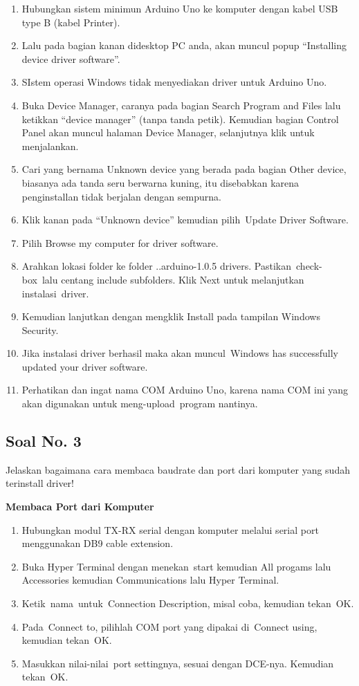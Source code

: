 \begin{enumerate}
	\item Hubungkan sistem minimun Arduino Uno ke komputer dengan kabel USB type B (kabel Printer).
	\item Lalu pada bagian kanan didesktop PC anda, akan muncul popup “Installing device driver software”.
	\item SIstem operasi Windows tidak menyediakan driver untuk Arduino Uno.
	\item Buka Device Manager, caranya pada bagian Search Program and Files lalu ketikkan “device manager” (tanpa tanda petik). Kemudian bagian Control Panel akan muncul halaman Device Manager, selanjutnya klik untuk menjalankan.
	\item Cari yang bernama Unknown device yang berada pada bagian Other device, biasanya ada tanda seru berwarna kuning, itu disebabkan karena penginstallan tidak berjalan dengan sempurna.
	\item Klik kanan pada “Unknown device” kemudian pilih Update Driver Software.
	\item Pilih Browse my computer for driver software.
	\item Arahkan lokasi folder ke folder ..arduino-1.0.5 drivers. Pastikan check-box lalu centang include subfolders. Klik Next untuk melanjutkan instalasi driver.
	\item Kemudian lanjutkan dengan mengklik Install pada tampilan Windows Security.
	\item Jika instalasi driver berhasil maka akan muncul Windows has successfully updated your driver software.
	\item Perhatikan dan ingat nama COM Arduino Uno, karena nama COM ini yang akan digunakan untuk meng-upload program nantinya.
\end{enumerate}

\subsection{Soal No. 3}
Jelaskan bagaimana cara membaca baudrate dan port dari komputer yang sudah terinstall driver!

\hfill \break
\textbf{Membaca Port dari Komputer}

\begin{enumerate}
	\item Hubungkan modul TX-RX serial dengan komputer melalui serial port menggunakan DB9 cable extension.
	\item Buka Hyper Terminal dengan menekan start kemudian All progams lalu Accessories kemudian Communications lalu Hyper Terminal.
	\item Ketik nama untuk Connection Description, misal coba, kemudian tekan OK.
	\item Pada Connect to, pilihlah COM port yang dipakai di Connect using, kemudian tekan OK.
	\item Masukkan nilai-nilai port settingnya, sesuai dengan DCE-nya. Kemudian tekan OK.
\end{enumerate}



